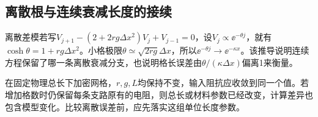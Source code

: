 \subsection{离散根与连续衰减长度的接续}
离散差模若写$V_{j+1}-(2+2rg\Delta x^2)V_j+V_{j-1}=0$，设$V_j\propto\ee^{-\theta j}$，就有$\cosh\theta=1+rg\Delta x^2$。小格极限$\theta\simeq\sqrt{2rg}\Delta x$，所以$\ee^{-\theta j}\to\ee^{-\kappa x}$。该推导说明连续方程保留了哪一条离散衰减分支，也说明格长误差由$\theta/(\kappa\Delta x)$偏离1来衡量。

在固定物理总长下加密网格，$r,g,L$均保持不变，输入阻抗应收敛到同一个值。若增加格数时仍保留每条支路原有的电阻，则总长或材料参数已经改变，计算差异也包含模型变化。比较离散误差前，应先落实这组单位长度参数。
